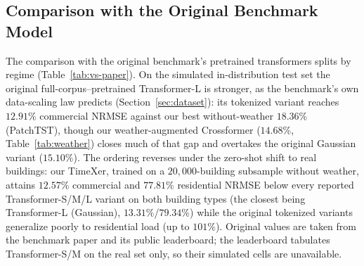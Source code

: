 \documentclass[11pt]{article}
\begin{document}
\subsection{Comparison with the Original Benchmark Model}
\label{sec:vs-original}
The comparison with the original benchmark's pretrained transformers splits by
regime (Table~\ref{tab:vs-paper}). On the simulated in-distribution test set the
original full-corpus--pretrained Transformer-L is stronger, as the benchmark's own
data-scaling law predicts (Section~\ref{sec:dataset}): its tokenized variant reaches
$12.91\%$ commercial NRMSE against our best without-weather $18.36\%$ (PatchTST),
though our weather-augmented Crossformer ($14.68\%$, Table~\ref{tab:weather}) closes
much of that gap and overtakes the original Gaussian variant ($15.10\%$). The
ordering reverses under the zero-shot shift to real buildings: our TimeXer, trained
on a $20{,}000$-building subsample without weather, attains $12.57\%$ commercial and
$77.81\%$ residential NRMSE below every reported Transformer-S/M/L variant on both
building types (the closest being Transformer-L (Gaussian), $13.31\%$/$79.34\%$) 
while the original tokenized variants generalize poorly to residential load (up to
$101\%$). Original values are taken from the benchmark paper and its public
leaderboard; the leaderboard tabulates Transformer-S/M on the real set only, so
their simulated cells are unavailable. 
\end{document}
